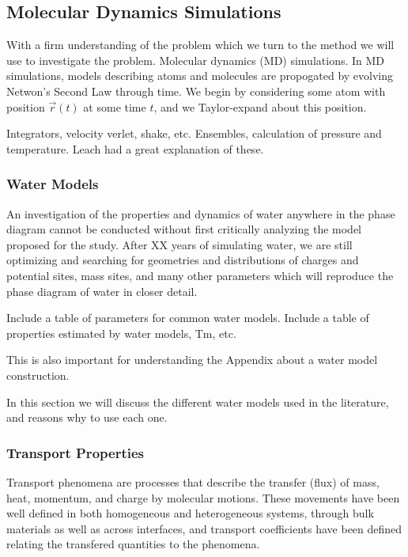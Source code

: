 \subsection{Molecular Dynamics Simulations}
With a firm understanding of the problem which we turn to the method
we will use to investigate the problem. Molecular dynamics (MD)
simulations. In MD simulations, models describing atoms and molecules
are propogated by evolving Netwon's Second Law through time. We begin
by considering some atom with position $\vec{r}(t)$ at some time $t$,
and we Taylor-expand about this position.

Integrators, velocity verlet, shake, etc. Ensembles, calculation of
pressure and temperature. Leach had a great explanation of these.



\subsubsection{Water Models}
An investigation of the properties and dynamics of water anywhere in
the phase diagram cannot be conducted without first critically
analyzing the model proposed for the study. After XX years of
simulating water, we are still optimizing and searching for geometries
and distributions of charges and potential sites, mass sites, and many
other parameters which will reproduce the phase diagram of water in
closer detail. 

Include a table of parameters for common water models.
Include a table of properties estimated by water models, Tm, etc.

This is also important for understanding the Appendix about a water
model construction.

In this section we will discuss the different water models used in the
literature, and reasons why to use each one. 

\subsubsection{Transport Properties}
Transport phenomena are processes that describe the transfer (flux) of
mass, heat, momentum, and charge by molecular motions. These movements
have been well defined in both homogeneous and heterogeneous systems,
through bulk materials as well as across interfaces, and transport
coefficients have been defined relating the transfered quantities to
the phenomena.


